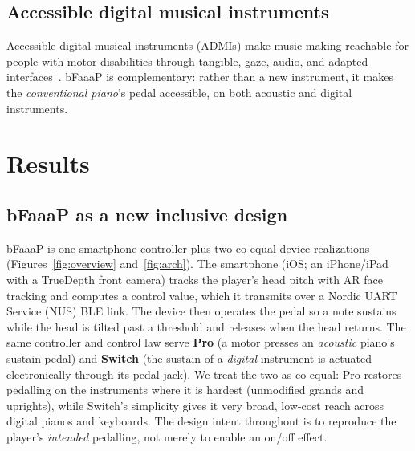 \subsection{Accessible digital musical instruments}
Accessible digital musical instruments (ADMIs) make music-making reachable for
people with motor disabilities through tangible, gaze, audio, and adapted
interfaces~\cite{frid2019,ramirez2023,duarte2023,eyeharp}. bFaaaP is complementary:
rather than a new instrument, it makes the \emph{conventional piano}'s pedal
accessible, on both acoustic and digital instruments.

\section{Results}
\label{sec:results}

\subsection{bFaaaP as a new inclusive design}
\label{sec:inclusive-design}
bFaaaP is one smartphone controller plus two co-equal device realizations
(Figures~\ref{fig:overview} and~\ref{fig:arch}). The smartphone
(iOS; an iPhone/iPad with a TrueDepth front camera) tracks the player's head
pitch with AR face tracking and computes a control value, which it transmits over
a Nordic UART Service (NUS) BLE link. The device then operates the pedal so a note
sustains while the head is tilted past a threshold and releases when the head
returns. The same controller and control law serve \textbf{Pro} (a motor presses
an \emph{acoustic} piano's sustain pedal) and \textbf{Switch} (the sustain of a
\emph{digital} instrument is actuated electronically through its pedal jack).
We treat the two as co-equal: Pro restores pedalling on the
instruments where it is hardest (unmodified grands and uprights), while Switch's
simplicity gives it very broad, low-cost reach across digital pianos and
keyboards. The design intent throughout is to reproduce the player's
\emph{intended} pedalling, not merely to enable an on/off effect.

